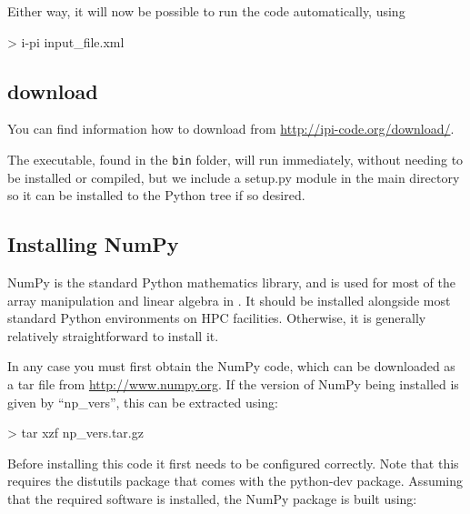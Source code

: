 \documentclass[11pt,english,fleqn]{report}
\newenvironment{code}{%
\footnotesize
\verbatim
}{
\endverbatim
\normalsize
}
\begin{document}
Either way, it will now be possible to run the code automatically, using

\begin{code}
> i-pi input_file.xml
\end{code}

\subsection{\ipi download}

%
%

You can find information how to download \ipi from \url{http://ipi-code.org/download/}.

%

The \ipi executable, found in the \texttt{bin} folder,  will run immediately, without needing to be installed
or compiled, but we include a setup.py module in the main directory so it can
be installed to the Python tree if so desired.

\subsection{Installing NumPy}

NumPy is the standard Python mathematics library, and is used for
most of the array manipulation and linear algebra in \ipi. It should
be installed alongside most standard Python environments on HPC facilities.
Otherwise, it is generally relatively straightforward to install it.

In any case you must first obtain the NumPy code, which can be downloaded
as a tar file from \url{http://www.numpy.org}. If the version of
NumPy being installed is given by {}``np\_vers'', this can be extracted
using:

\begin{code}
> tar xzf np_vers.tar.gz
\end{code}

Before installing this code it first needs to be configured correctly.
Note that this requires the distutils package that comes with the
python-dev package. Assuming that the required software is installed,
the NumPy package is built using:
\end{document}
